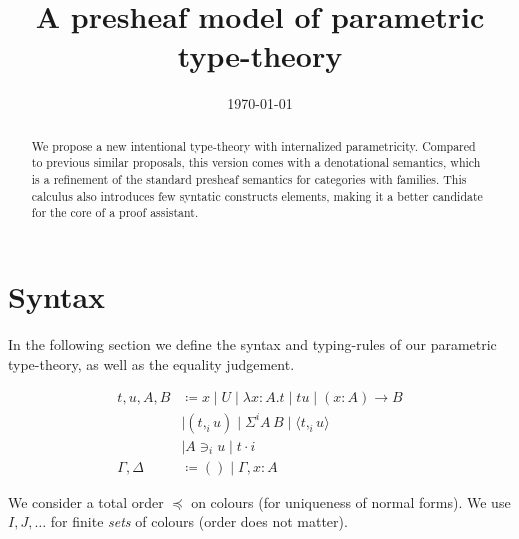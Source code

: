 \documentclass[english]{PaperTools/latex/lipics}
\title{A presheaf model of parametric type-theory}
\author{}
\date{\today}
\newcommand\CP[3]{(#2,_{#1} #3)}
\newcommand\param[1]{\!\cdot\!#1}
\newcommand\op[1]{∋_{#1}}
\newcommand\ip[3]{Σ^{#1} {#2}\,{#3}}
\newcommand\fp[3]{⟨#2 ,_{#1} #3⟩}
\begin{document}
\maketitle

\begin{abstract}
  We propose a new intentional type-theory with internalized
  parametricity. Compared to previous similar proposals, this version
  comes with a denotational semantics, which is a refinement of the
  standard presheaf semantics for categories with families.
  This calculus also introduces few syntatic constructs elements, making
  it a better candidate for the core of a proof assistant.
\end{abstract}

\section{Syntax}
In the following section we define the syntax and typing-rules of our
parametric type-theory, as well as the equality judgement.

\begin{definition}
  \begin{align*}
    t,u,A,B & \coloneqq x \mid U \mid λx:A. t      \mid t u \mid (x:A) → B \\
            & \mid \CP i t u  \mid \ip i A B  \mid \fp i t u \\
            & \mid A \op i u \mid t \param i  \\
    \Gamma,\Delta & \coloneqq () \mid \Gamma,x:A
  \end{align*}
\end{definition}

We consider a total order $\preccurlyeq$ on colours (for uniqueness of
normal forms).
We use $I,J,…$ for finite {\em sets} of colours (order does not matter).
\end{document}
